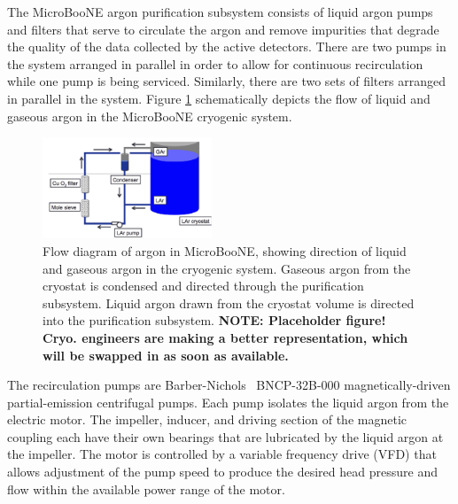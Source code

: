 The MicroBooNE argon purification subsystem consists of liquid argon pumps and filters that serve to circulate the argon and remove impurities that degrade the quality of the data collected by the active detectors.  There are two pumps in the system arranged in parallel in order to allow for continuous recirculation while one pump is being serviced.  Similarly, there are two sets of filters arranged in parallel in the system.  Figure \ref{flowdiagram} schematically depicts the flow of liquid and gaseous argon in the MicroBooNE cryogenic system.

\begin{figure}
\centering 
\includegraphics[width=0.45\textwidth]{figures/flow_diagram.jpg}
\caption{Flow diagram of argon in MicroBooNE, showing direction of liquid and gaseous argon in the cryogenic system.  Gaseous argon from the cryostat is condensed and directed through the purification subsystem. Liquid argon drawn from the cryostat volume is directed into the purification subsystem.  \textbf{NOTE: Placeholder figure!  Cryo. engineers are making a better representation, which will be swapped in as soon as available.}}
\label{flowdiagram}
\end{figure}



The recirculation pumps are Barber-Nichols~\cite{barber-nichols} BNCP-32B-000 magnetically-driven partial-emission centrifugal pumps.  Each pump isolates the liquid argon from the electric motor.  The impeller, inducer, and driving section of the magnetic coupling each have their own bearings that are lubricated by the liquid argon at the impeller.  The motor is controlled by a variable frequency drive (VFD) that allows adjustment of the pump speed to produce the desired head pressure and flow within the available power range of the motor.    


